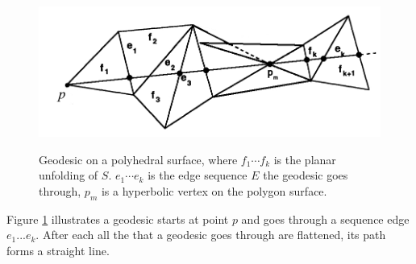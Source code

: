 \begin{figure}[H]
	\includegraphics[width=\columnwidth]{../images/geodesic_polyDef_2}\\[0.1cm]
    \caption[Geodesic on a polyhedral surface]{Geodesic on a polyhedral surface, where $f_{1}\cdots f_{k}$ is the planar unfolding of $S$. $e_{1}\cdots e_{k}$ is the edge sequence $E$ the geodesic goes through, $p_{m}$ is a hyperbolic vertex on the polygon surface.}
    \label{figure:geo_polyDef}
\end{figure}

Figure \ref{figure:geo_polyDef} illustrates a geodesic starts at point $p$ and goes through a sequence edge $e_{1} ... e_{k}$. After each all the that a geodesic goes through are flattened, its path forms a straight line.


%

